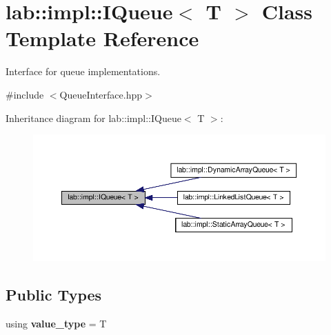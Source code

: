\hypertarget{classlab_1_1impl_1_1IQueue}{}\section{lab\+:\+:impl\+:\+:I\+Queue$<$ T $>$ Class Template Reference}
\label{classlab_1_1impl_1_1IQueue}


Interface for queue implementations.  




{\ttfamily \#include $<$Queue\+Interface.\+hpp$>$}



Inheritance diagram for lab\+:\+:impl\+:\+:I\+Queue$<$ T $>$\+:
\nopagebreak
\begin{figure}[H]
\begin{center}
\leavevmode
\includegraphics[width=350pt]{classlab_1_1impl_1_1IQueue__inherit__graph}
\end{center}
\end{figure}
\subsection*{Public Types}
\begin{DoxyCompactItemize}
\item 
\mbox{\label{classlab_1_1impl_1_1IQueue_ada5c0aea26506e96fca44bf54d7ee7c1}} 
using {\bfseries value\+\_\+type} = T
\end{DoxyCompactItemize}
